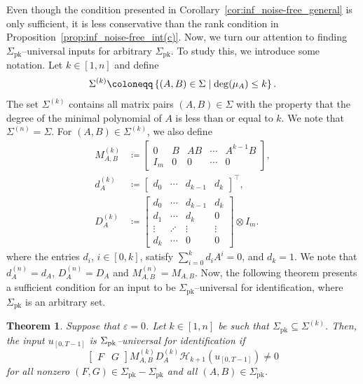 \documentclass[journal,twoside,web]{ieeecolor}
\newcommand{\set}[2]{\left\{#1 \mid #2\right\}}
\newtheorem{theorem}{Theorem}
\begin{document}
Even though the condition presented in Corollary~\ref{cor:inf_noise-free_general} is only sufficient, it is less conservative than the rank condition in Proposition~\ref{prop:inf_noise-free_int(c)}. Now, we turn our attention to finding $\Sigma_\text{pk}$--universal inputs for arbitrary $\Sigma_\text{pk}$. To study this, we introduce some notation. Let $k\in[1,n]$ and define
\begin{equation}
\label{eq:Sigma^{(k)}}
\Sigma^{(k)}\coloneqq\set{(A,B)\in\Sigma}{\deg(\mu_A)\leq k}.
\end{equation}
The set $\Sigma^{(k)}$ contains all matrix pairs $(A,B)\in\Sigma$ with the property that the degree of the minimal polynomial of $A$ is less than or equal to $k$. We note that $\Sigma^{(n)}=\Sigma$. For $(A,B)\in\Sigma^{(k)}$, we also define
\begin{subequations}
\label{eq:definitions}
\begin{align}
\label{eq:M_A,B^k}
M_{A,B}^{(k)}&\coloneqq \begin{bmatrix}
0 & B & AB & \cdots & A^{k-1} B \\
I_m & 0 & 0 & \cdots & 0
\end{bmatrix}, \\
\label{eq:d_A^k}
d_A^{(k)}&\coloneqq \begin{bmatrix}
d_0 & \cdots & d_{k-1} & d_k
\end{bmatrix}^\top,\\
\label{eq:D_A^k}
D_{A}^{(k)}&\coloneqq \begin{bmatrix}
d_0 & \cdots & d_{k-1} & d_k \\
d_1 & \cdots & d_k & 0 \\
\vdots & \iddots & \vdots & \vdots \\
d_k & \cdots & 0 & 0
\end{bmatrix}\otimes I_m.
\end{align}
\end{subequations}
where the entries $d_i$, $i\in[0,k]$, satisfy $\sum_{i=0}^{k}d_iA^i=0$, and $d_k=1$. We note that $d_A^{(n)}=d_A$, $D_A^{(n)}=D_A$ and $M_{A,B}^{(n)}=M_{A,B}$. Now, the following theorem presents a sufficient condition for an input to be $\Sigma_\text{pk}$--universal for identification, where $\Sigma_\text{pk}$ is an arbitrary set. 

\begin{theorem}
\label{th:GM_noiseless_generalized}
Suppose that $\varepsilon=0$. Let $k\in[1,n]$ be such that $\Sigma_\text{pk}\subseteq\Sigma^{(k)}$. Then, the input $u_{[0,T-1]}$ is $\Sigma_\textup{pk}$--universal for identification if 
\begin{equation}
\label{eq:th:GM_noiseless_generalized-1}
\begin{bmatrix}
F & G
\end{bmatrix}M_{A,B}^{(k)}D_A^{(k)}\mathcal{H}_{k+1}(u_{[0,T-1]})\neq 0
\end{equation}
for all nonzero $(F,G)\in\Sigma_\text{pk}-\Sigma_\text{pk}$ and all $(A,B)\in\Sigma_\text{pk}$.
\end{theorem}
\end{document}
